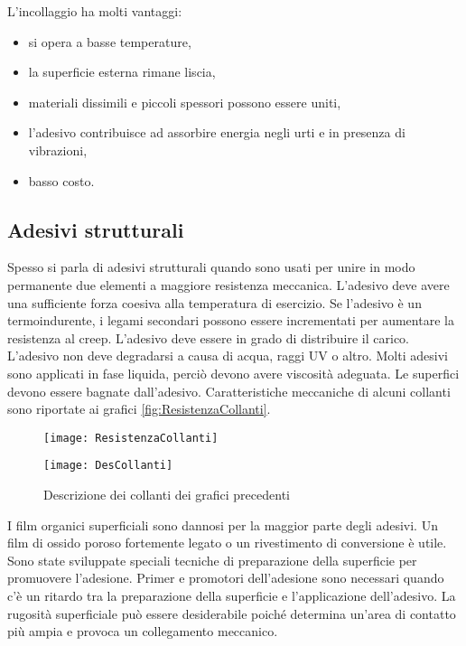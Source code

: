 L'incollaggio ha molti vantaggi:
\begin{itemize}
\item si opera a basse temperature,
\item la superficie esterna rimane liscia,
\item materiali dissimili e piccoli spessori possono essere uniti,
\item  l'adesivo contribuisce ad assorbire energia negli urti e in presenza di vibrazioni,
\item basso costo.
\end{itemize}

\subsection{Adesivi strutturali}
Spesso si parla di adesivi strutturali quando sono usati per unire in modo permanente due elementi a maggiore resistenza meccanica.
L'adesivo deve avere una sufficiente forza coesiva alla temperatura  di esercizio.
Se l'adesivo è un termoindurente, i legami secondari possono essere incrementati per aumentare la resistenza al creep.
L'adesivo deve essere in grado di distribuire il carico.
L'adesivo non deve degradarsi a causa di acqua, raggi UV o altro.
Molti adesivi sono applicati in fase liquida, perciò devono avere viscosità adeguata.
Le superfici devono essere bagnate dall'adesivo.
Caratteristiche meccaniche di alcuni collanti sono riportate ai grafici \ref{fig:ResistenzaCollanti}.

\begin{figure}
\centering
\texttt{[image: ResistenzaCollanti]}
\caption{Diagrammi di resistenza meccanica di alcuni collanti, la descrizione dei collanti è riportato alla figura successiva \ref{fig:DesCollanti}}
\label{fig:ResistenzaCollanti}
\texttt{[image: DesCollanti]}
\caption{Descrizione dei collanti dei grafici precedenti}
\label{fig:DesCollanti}
\end{figure}

I film organici superficiali sono dannosi per la maggior parte degli adesivi. Un film di ossido poroso fortemente legato o un rivestimento di conversione è utile.
Sono state sviluppate speciali tecniche di preparazione della superficie per promuovere l'adesione.
Primer e promotori dell'adesione sono necessari quando c'è un ritardo tra la preparazione della superficie e l'applicazione dell'adesivo.
La rugosità superficiale può essere desiderabile poiché determina un'area di contatto più ampia e provoca un collegamento meccanico.

